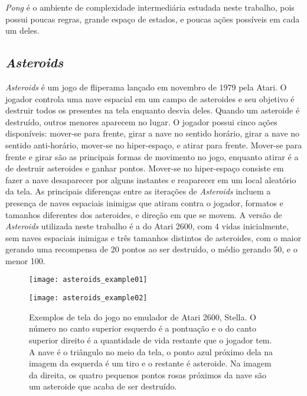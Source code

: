 \textit{Pong} é o ambiente de complexidade intermediária estudada neste trabalho, pois possui poucas regras, grande espaço de estados, e poucas ações possíveis em cada um deles.

\subsection{\textit{Asteroids}}
\label{sec:asteroids}

\textit{Asteroids} é um jogo de fliperama
lançado em novembro de 1979 pela
Atari.
O jogador controla uma nave espacial em um campo de asteroides e seu objetivo é destruir todos os presentes na tela enquanto desvia deles.
Quando um asteroide é destruído, outros menores aparecem no lugar.
O jogador possui cinco ações disponíveis: mover-se para frente, girar a nave no sentido horário, girar a nave no sentido anti-horário, mover-se no hiper-espaço, e atirar para frente.
Mover-se para frente e girar são as principais formas de movimento no jogo, enquanto atirar é a de destruir asteroides e ganhar pontos.
Mover-se no hiper-espaço consiste em fazer a nave desaparecer por alguns instantes e reaparecer em um local aleatório da tela.
As principais diferenças entre as iterações de \textit{Asteroids} incluem a presença de naves espaciais inimigas que atiram contra o jogador, formatos e tamanhos diferentes dos asteroides, e direção em que se movem.
A versão de \textit{Asteroids} utilizada neste trabalho é a do Atari 2600, com 4 vidas inicialmente, sem naves espaciais inimigas e três tamanhos distintos de asteroides, com o maior gerando uma recompensa de 20 pontos ao ser destruído, o médio gerando 50, e o menor 100.

\begin{figure}[h!]
  \begin{minipage}[b]{.5\textwidth}
  \centering
  \texttt{[image: asteroids\_example01]}
  \end{minipage}
  \hfill
  \begin{minipage}[b]{.5\textwidth}
  \texttt{[image: asteroids\_example02]}
  \end{minipage}
  \caption{Exemplos de tela do jogo no emulador de Atari 2600, Stella. O número no canto superior esquerdo é a pontuação e o do canto superior direito é a quantidade de vida restante que o jogador tem. A nave é o triângulo no meio da tela, o ponto azul próximo dela na imagem da esquerda é um tiro e o restante é asteroide. Na imagem da direita, os quatro pequenos pontos rosas próximos da nave são um asteroide que acaba de ser destruído.}
\end{figure}

